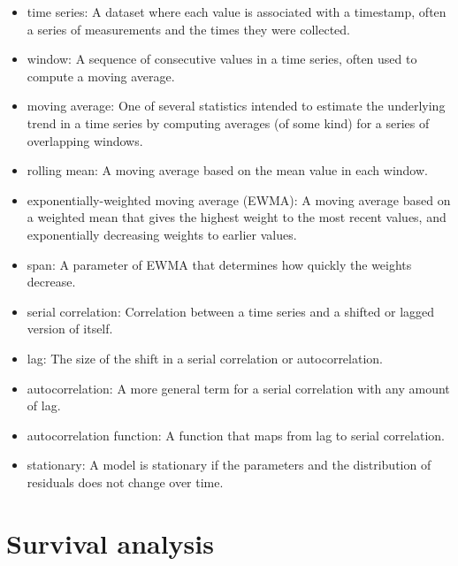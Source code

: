 \documentclass[12pt]{book}
\begin{document}
\begin{itemize}

\item time series: A dataset where each value is associated with
a timestamp, often a series of measurements and the times they
were collected.

\item window: A sequence of consecutive values in a time series,
often used to compute a moving average.

\item moving average: One of several statistics intended to estimate
the underlying trend in a time series by computing averages (of
some kind) for a series of overlapping windows.

\item rolling mean: A moving average based on the mean value in
each window.

\item exponentially-weighted moving average (EWMA): A moving
average based on a weighted mean that gives the highest weight
to the most recent values, and exponentially decreasing weights
to earlier values.

\item span: A parameter of EWMA that determines how quickly the
weights decrease.

\item serial correlation: Correlation between a time series and
a shifted or lagged version of itself.

\item lag: The size of the shift in a serial correlation or
autocorrelation.

\item autocorrelation: A more general term for a serial correlation
with any amount of lag.

\item autocorrelation function: A function that maps from lag to
serial correlation.

\item stationary: A model is stationary if the parameters and the
distribution of residuals does not change over time.

\end{itemize}



\chapter{Survival analysis}
\end{document}
